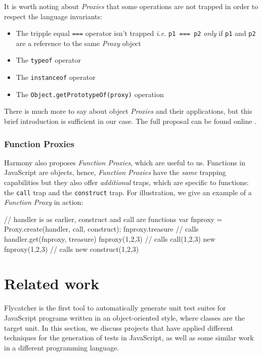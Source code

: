 It is worth noting about \emph{Proxies} that some operations are not trapped in order to respect the language invariants:

\begin{itemize}
   \item The tripple equal \texttt{===} operator isn't trapped \emph{i.e.} \texttt{p1 === p2} \emph{only} if \texttt{p1} and \texttt{p2} are a reference to the same \emph{Proxy} object
   \item The \texttt{typeof} operator
   \item The \texttt{instanceof} operator
   \item The \texttt{Object.getPrototypeOf(proxy)} operation
\end{itemize}

There is much more to say about object \emph{Proxies} and their applications, but this brief introduction is sufficient in our case. The full proposal can be found online \cite{harmony}.

\subsubsection{Function Proxies}

Harmony also proposes \emph{Function Proxies}, which are useful to us. Functions in JavaScript are objects, hence, \emph{Function Proxies} have the \emph{same} trapping capabilities but they also offer \emph{additional} traps, which are specific to functions: the \texttt{call} trap and the \texttt{construct} trap. For illustration, we give an example of a \emph{Function Proxy} in action:

\begin{code}[caption=Function Proxy,label=fnproxy]
// handler is as earlier, construct and call are functions
var fnproxy = Proxy.create(handler, call, construct);
fnproxy.treasure   // calls handler.get(fnproxy, treasure)
fnproxy(1,2,3)     // calls call(1,2,3)
new fnproxy(1,2,3) // calls new construct(1,2,3)
\end{code}

\section{Related work}
\textsf{Flycatcher} is the first tool to automatically generate unit test suites for JavaScript programs written in an object-oriented style, where classes are the target unit. In this section, we discuss projects that have applied different techniques for the generation of tests in JavaScript, as well as some similar work in a different programming language.

